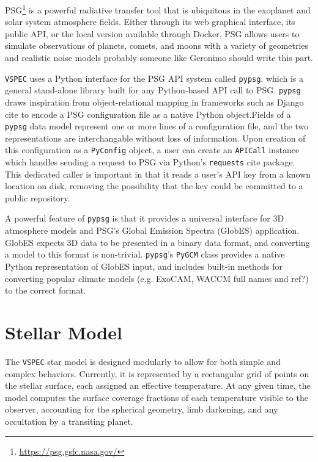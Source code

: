 \documentclass[twocolumn]{aastex631}
\newcommand{\TJ}[1]{\textcolor{tedcommentcolor}{#1}}
\newcommand{\vspec}[1]{\texttt{VSPEC}#1}
\begin{document}
PSG\footnote{\url{https://psg.gsfc.nasa.gov/}} \citep{villanueva2018} is a powerful radiative transfer tool that is ubiquitous in the exoplanet and solar system atmosphere fields. Either through its web graphical interface, its public API, or the local version available through Docker, PSG allows users to simulate observations of planets, comets, and moons with a variety of geometries and realistic noise models \TJ{probably someone like Geronimo should write this part}.

\vspec{} uses a Python interface for the PSG API system called \texttt{pypsg}, which is a general stand-alone library built for any Python-based API call to PSG. \texttt{pypsg} draws inspiration from object-relational mapping in frameworks such as Django \TJ{cite} to encode a PSG configuration file as a native Python object.Fields of a \texttt{pypsg} data model represent one or more lines of a configuration file, and the two representations are interchangable without loss of information. Upon creation of this configuration as a \texttt{PyConfig} object, a user can create an \texttt{APICall} instance which handles sending a request to PSG via Python's \texttt{requests} \TJ{cite} package. This dedicated caller is important in that it reads a user's API key from a known location on disk, removing the possibility that the key
could be committed to a public repository.

A powerful feature of \texttt{pypsg} is that it provides a universal interface for 3D atmosphere models and PSG's Global Emission Spectra (GlobES) application.
GlobES expects 3D data to be presented in a binary data format, and converting a model to this format is non-trivial. \texttt{pypsg}'s \texttt{PyGCM} class provides a native Python representation of GlobES input, and includes built-in methods for converting popular climate models (e.g. ExoCAM, WACCM \TJ{full names and ref?}) to the correct format.

\section{Stellar Model}
\label{sec:star}

The \vspec{} star model is designed modularly to allow
for both simple and complex behaviors. Currently, it
is represented by a rectangular grid of points on the stellar surface,
each assigned an effective temperature. At any given time, the model computes
the surface coverage fractions of each temperature visible to the observer, accounting for the
spherical geometry, limb darkening, and any occultation by a transiting planet.
\end{document}
